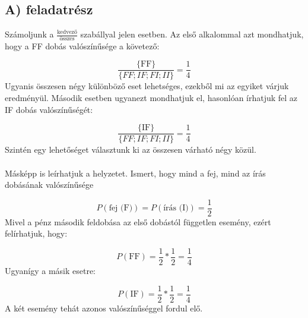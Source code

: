 \section{}
\subsection*{A) feladatrész}
Számoljunk a $\frac{\text{kedvező}}{\text{összes}}$ szabállyal jelen esetben. Az első alkalommal azt mondhatjuk, hogy a FF dobás valószínűsége a követező:

\begin{equation} \label{eq:1}
    \frac{\text{\{FF\}}}{\{FF; IF; FI; II\}} = \frac{1}{4}
\end{equation}
Ugyanis összesen négy különböző eset lehetséges, ezekből mi az egyiket várjuk eredményül. Második esetben ugyanezt mondhatjuk el, hasonlóan írhatjuk fel az IF dobás valószínűségét:

\begin{equation} \label{eq:2}
    \frac{\text{\{IF\}}}{\{FF; IF; FI; II\}} = \frac{1}{4}
\end{equation}
Szintén egy lehetőséget választunk ki az összesen várható négy közül.
\\ \\
Másképp is leírhatjuk a helyzetet. Ismert, hogy mind a fej, mind az írás dobásának valószínűsége

\begin{equation} \label{eq:3}
    P \left( \text{fej (F)} \right) = P \left( \text{írás (I)} \right) = \frac{1}{2}
\end{equation}
Mivel a pénz második feldobása az első dobástól független esemény, ezért felírhatjuk, hogy:

\begin{equation} \label{eq:4}
    P \left( \text{FF} \right) = \frac{1}{2} * \frac{1}{2} = \frac{1}{4}
\end{equation}
Ugyanígy a másik esetre:

\begin{equation} \label{eq:5}
    P \left( \text{IF} \right) = \frac{1}{2} * \frac{1}{2} = \frac{1}{4}
\end{equation}
A két esemény tehát azonos valószínűséggel fordul elő.

